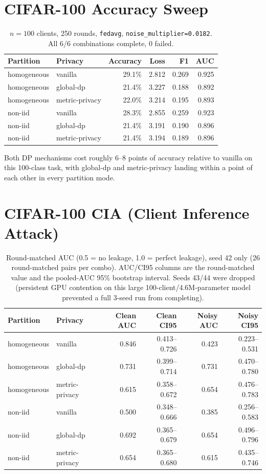 \documentclass[11pt]{article}
\newcommand{\code}[1]{\texttt{#1}}
\begin{document}
\section*{CIFAR-100 Accuracy Sweep}

\begin{table}[h!]
\centering
\begin{tabular}{llrrrr}
\toprule
Partition & Privacy & Accuracy & Loss & F1 & AUC \\
\midrule
homogeneous & vanilla & 29.1\% & 2.812 & 0.269 & 0.925 \\
homogeneous & global-dp & 21.4\% & 3.227 & 0.188 & 0.892 \\
homogeneous & metric-privacy & 22.0\% & 3.214 & 0.195 & 0.893 \\
non-iid & vanilla & 28.3\% & 2.855 & 0.259 & 0.923 \\
non-iid & global-dp & 21.4\% & 3.191 & 0.190 & 0.896 \\
non-iid & metric-privacy & 21.4\% & 3.194 & 0.189 & 0.896 \\
\bottomrule
\end{tabular}
\caption*{$n=100$ clients, 250 rounds, \code{fedavg}, \code{noise\_multiplier=0.0182}. All 6/6
combinations complete, 0 failed.}
\end{table}

\noindent
Both DP mechanisms cost roughly 6--8 points of accuracy relative to vanilla on this 100-class
task, with global-dp and metric-privacy landing within a point of each other in every partition
mode.

\section*{CIFAR-100 CIA (Client Inference Attack)}

\begin{table}[h!]
\centering
\begin{tabular}{llrrrr}
\toprule
Partition & Privacy & Clean AUC & Clean CI95 & Noisy AUC & Noisy CI95 \\
\midrule
homogeneous & vanilla & 0.846 & 0.413--0.726 & 0.423 & 0.223--0.531 \\
homogeneous & global-dp & 0.731 & 0.399--0.714 & 0.731 & 0.470--0.780 \\
homogeneous & metric-privacy & 0.615 & 0.358--0.672 & 0.654 & 0.476--0.783 \\
non-iid & vanilla & 0.500 & 0.348--0.666 & 0.385 & 0.256--0.583 \\
non-iid & global-dp & 0.692 & 0.365--0.679 & 0.654 & 0.496--0.796 \\
non-iid & metric-privacy & 0.654 & 0.365--0.680 & 0.615 & 0.435--0.746 \\
\bottomrule
\end{tabular}
\caption*{Round-matched AUC (0.5 = no leakage, 1.0 = perfect leakage), seed 42 only (26
round-matched pairs per combo). AUC/CI95 columns are the round-matched value and the pooled-AUC
95\% bootstrap interval. Seeds 43/44 were dropped (persistent GPU contention on this large
100-client/4.6M-parameter model prevented a full 3-seed run from completing).}
\end{table}
\end{document}
